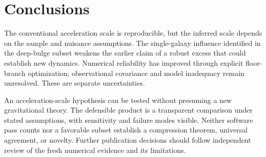 \documentclass[11pt]{article}
\begin{document}
\section{Conclusions}
The conventional acceleration scale is reproducible, but the inferred scale
depends on the sample and nuisance assumptions. The single-galaxy influence
identified in the deep-bulge subset weakens the earlier claim of a robust excess
that could establish new dynamics. Numerical reliability has improved through
explicit floor-branch optimization; observational covariance and model inadequacy
remain unresolved. These are separate uncertainties.

An acceleration-scale hypothesis can be tested without presuming a new gravitational theory. The defensible product is a transparent comparison under stated assumptions, with sensitivity and failure modes visible. Neither software pass counts nor a favorable subset establish a compression theorem, universal agreement, or novelty. Further publication decisions should follow independent review of the fresh numerical evidence and its limitations.



\end{document}
